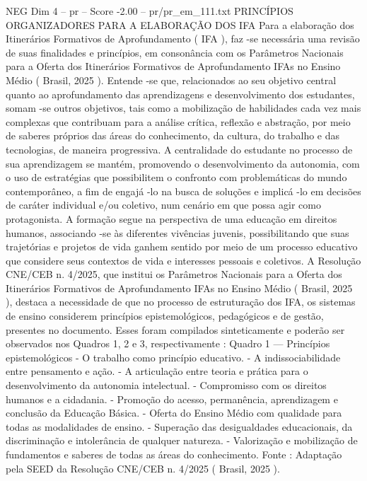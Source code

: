 \begin{textsample}{NEG Dim 4 – pr – Score -2.00 – pr/pr\_em\_111.txt}  \label{ex:f4_neg_107}
PRINCÍPIOS ORGANIZADORES PARA A ELABORAÇÃO DOS IFA Para a elaboração dos Itinerários Formativos de Aprofundamento ( IFA ), faz -se necessária uma revisão de suas finalidades e princípios, em consonância com os Parâmetros Nacionais para a Oferta dos Itinerários Formativos de Aprofundamento IFAs no Ensino Médio ( Brasil, 2025 ).
Entende -se que, relacionados ao seu objetivo central quanto ao aprofundamento das aprendizagens e desenvolvimento dos estudantes, somam -se outros objetivos, tais como a mobilização de habilidades cada vez mais complexas que contribuam para a análise crítica, reflexão e abstração, por meio de saberes próprios das áreas do conhecimento, da cultura, do trabalho e das tecnologias, de maneira progressiva.
A centralidade do estudante no processo de sua aprendizagem se mantém, promovendo o desenvolvimento da autonomia, com o uso de estratégias que possibilitem o confronto com problemáticas do mundo contemporâneo, a fim de engajá -lo na busca de soluções e implicá -lo em decisões de caráter individual e/ou coletivo, num cenário em que possa agir como protagonista.
A formação segue na perspectiva de uma educação em direitos humanos, associando -se às diferentes vivências juvenis, possibilitando que suas trajetórias e projetos de vida ganhem sentido por meio de um processo educativo que considere seus contextos de vida e interesses pessoais e coletivos.
A Resolução CNE/CEB n. 4/2025, que institui os Parâmetros Nacionais para a Oferta dos Itinerários Formativos de Aprofundamento IFAs no Ensino Médio ( Brasil, 2025 ), destaca a necessidade de que no processo de estruturação dos IFA, os sistemas de ensino considerem princípios epistemológicos, pedagógicos e de gestão, presentes no documento.
Esses foram compilados sinteticamente e poderão ser observados nos Quadros 1, 2 e 3, respectivamente : Quadro 1 — Princípios epistemológicos - O trabalho como princípio educativo. - A indissociabilidade entre pensamento e ação. - A articulação entre teoria e prática para o desenvolvimento da autonomia intelectual. - Compromisso com os direitos humanos e a cidadania. - Promoção do acesso, permanência, aprendizagem e conclusão da Educação Básica. - Oferta do Ensino Médio com qualidade para todas as modalidades de ensino. - Superação das desigualdades educacionais, da discriminação e intolerância de qualquer natureza. - Valorização e mobilização de fundamentos e saberes de todas as áreas do conhecimento.
Fonte : Adaptação pela SEED da Resolução CNE/CEB n. 4/2025 ( Brasil, 2025 ).

\end{textsample}
